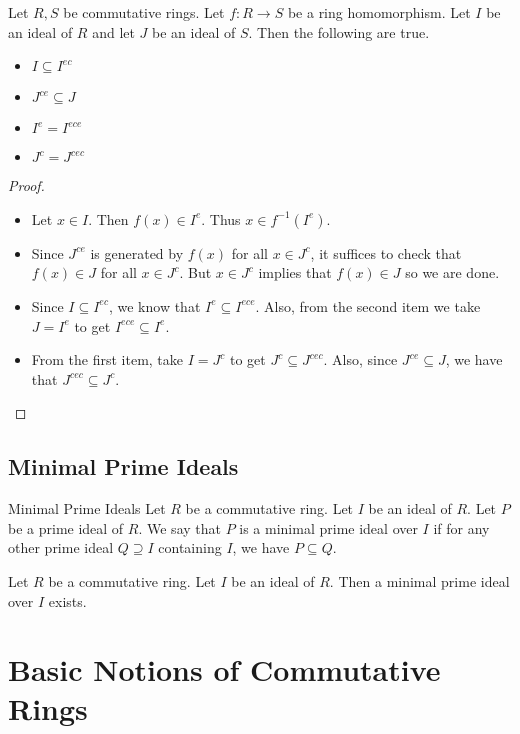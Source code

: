\documentclass[a4paper]{article}
\begin{document}
\begin{prp}{}{} Let $R,S$ be commutative rings. Let $f:R\to S$ be a ring homomorphism. Let $I$ be an ideal of $R$ and let $J$ be an ideal of $S$. Then the following are true. 
\begin{itemize}
\item $I\subseteq I^{ec}$
\item $J^{ce}\subseteq J$
\item $I^e=I^{ece}$
\item $J^c=J^{cec}$
\end{itemize} \tcbline
\begin{proof}~\\
\begin{itemize}
\item Let $x\in I$. Then $f(x)\in I^e$. Thus $x\in f^{-1}(I^e)$. 
\item Since $J^{ce}$ is generated by $f(x)$ for all $x\in J^c$, it suffices to check that $f(x)\in J$ for all $x\in J^c$. But $x\in J^c$ implies that $f(x)\in J$ so we are done. 
\item Since $I\subseteq I^{ec}$, we know that $I^e\subseteq I^{ece}$. Also, from the second item we take $J=I^e$ to get $I^{ece}\subseteq I^e$. 
\item From the first item, take $I=J^c$ to get $J^c\subseteq J^{cec}$. Also, since $J^{ce}\subseteq J$, we have that $J^{cec}\subseteq J^c$. 
\end{itemize}
\end{proof}
\end{prp}

\subsection{Minimal Prime Ideals}
\begin{defn}{Minimal Prime Ideals}{} Let $R$ be a commutative ring. Let $I$ be an ideal of $R$. Let $P$ be a prime ideal of $R$. We say that $P$ is a minimal prime ideal over $I$ if for any other prime ideal $Q\supseteq I$ containing $I$, we have $P\subseteq Q$. 
\end{defn}

\begin{prp}{}{} Let $R$ be a commutative ring. Let $I$ be an ideal of $R$. Then a minimal prime ideal over $I$ exists. 
\end{prp}

\pagebreak
\section{Basic Notions of Commutative Rings}
\end{document}
